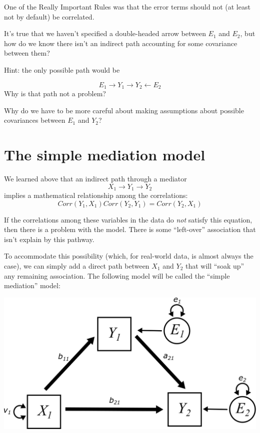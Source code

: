 \documentclass[
]{book}
\begin{document}
One of the Really Important Rules was that the error terms should not (at least not by default) be correlated.

It's true that we haven't specified a double-headed arrow between \(E_{1}\) and \(E_{2}\), but how do we know there isn't an indirect path accounting for some covariance between them?

Hint: the only possible path would be

\[
E_{1} \rightarrow Y_{1} \boldsymbol{\rightarrow} Y_{2} \leftarrow E_{2}
\]
Why is that path not a problem?

Why do we have to be more careful about making assumptions about possible covariances between \(E_{1}\) and \(Y_{2}\)?

\hypertarget{mediation-simple}{%
\section{The simple mediation model}\label{mediation-simple}}

We learned above that an indirect path through a mediator
\[
X_{1} \rightarrow Y_{1} \boldsymbol{\rightarrow} Y_{2}
\]
implies a mathematical relationship among the correlations:
\[
Corr(Y_{1}, X_{1}) Corr(Y_{2}, Y_{1}) = Corr(Y_{2}, X_{1})
\]

If the correlations among these variables in the data do \emph{not} satisfy this equation, then there is a problem with the model. There is some ``left-over'' association that isn't explain by this pathway.

To accommodate this possibility (which, for real-world data, is almost always the case), we can simply add a direct path between \(X_{1}\) and \(Y_{2}\) that will ``soak up'' any remaining association. The following model will be called the ``simple mediation'' model:

\begin{center}\includegraphics{graphics/mediation_vars} \end{center}
\end{document}
